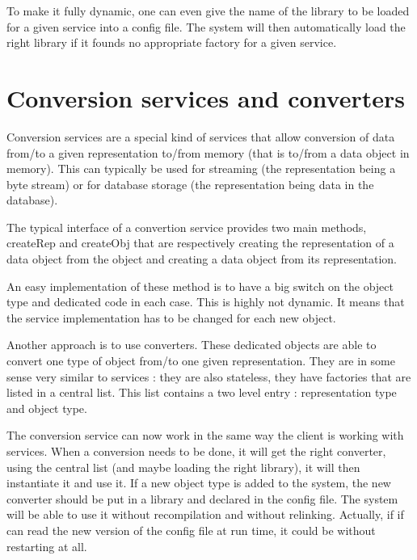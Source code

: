 To make it fully dynamic, one can even give the name of the library
to be loaded for a given service into a config file. The system will
then automatically load the right library if it founds no appropriate
factory for a given service.


\section{Conversion services and converters}

Conversion services are a special kind of services that allow
conversion of data from/to a given representation to/from memory
(that is to/from a data object in memory). This can typically be
used for streaming (the representation being a byte stream) or
for database storage (the representation being data in the database).

The typical interface of a convertion service provides two main
methods, createRep and createObj that are respectively creating
the representation of a data object from the object and creating
a data object from its representation.

An easy implementation of these method is to have a big switch
on the object type and dedicated code in each case. This is
highly not dynamic. It means that the service implementation has
to be changed for each new object.

Another approach is to use converters. These dedicated objects are
able to convert one type of object from/to one given representation.
They are in some sense very similar to services : they are also
stateless, they have factories that are listed in a central list.
This list contains a two level entry : representation type and
object type.

The conversion service can now work in the same way the client
is working with services. When a conversion needs to be done, it
will get the right converter, using the central list (and maybe
loading the right library), it will then instantiate it and use it.
If a new object type is added to the system, the new converter should
be put in a library and declared in the config file. The system will
be able to use it without recompilation and without relinking.
Actually, if if can read the new version of the config file at
run time, it could be without restarting at all.

